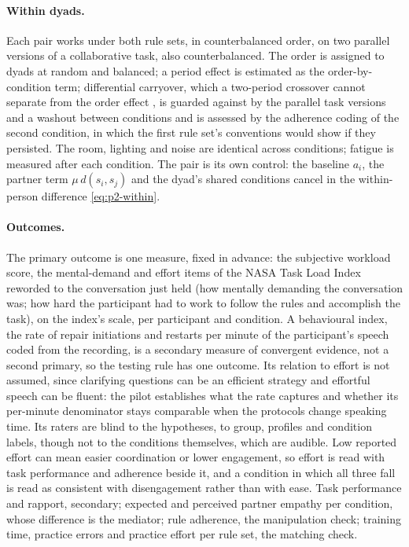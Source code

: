 \paragraph{Within dyads.} Each pair works under both rule sets, in counterbalanced order, on two parallel versions of a collaborative task, also counterbalanced. The order is assigned to dyads at random and balanced; a period effect is estimated as the order-by-condition term; differential carryover, which a two-period crossover cannot separate from the order effect \cite{Senn2002}, is guarded against by the parallel task versions and a washout between conditions and is assessed by the adherence coding of the second condition, in which the first rule set's conventions would show if they persisted. The room, lighting and noise are identical across conditions; fatigue is measured after each condition. The pair is its own control: the baseline $a_i$, the partner term $\mu\, d(s_i, s_j)$ and the dyad's shared conditions cancel in the within-person difference \eqref{eq:p2-within}.

\paragraph{Outcomes.} The primary outcome is one measure, fixed in advance: the subjective workload score, the mental-demand and effort items of the NASA Task Load Index \cite{HartStaveland1988} reworded to the conversation just held (how mentally demanding the conversation was; how hard the participant had to work to follow the rules and accomplish the task), on the index's scale, per participant and condition. A behavioural index, the rate of repair initiations and restarts per minute of the participant's speech coded from the recording, is a secondary measure of convergent evidence, not a second primary, so the testing rule has one outcome. Its relation to effort is not assumed, since clarifying questions can be an efficient strategy and effortful speech can be fluent: the pilot establishes what the rate captures and whether its per-minute denominator stays comparable when the protocols change speaking time. Its raters are blind to the hypotheses, to group, profiles and condition labels, though not to the conditions themselves, which are audible. Low reported effort can mean easier coordination or lower engagement, so effort is read with task performance and adherence beside it, and a condition in which all three fall is read as consistent with disengagement rather than with ease. Task performance and rapport, secondary; expected and perceived partner empathy per condition, whose difference is the mediator; rule adherence, the manipulation check; training time, practice errors and practice effort per rule set, the matching check.

